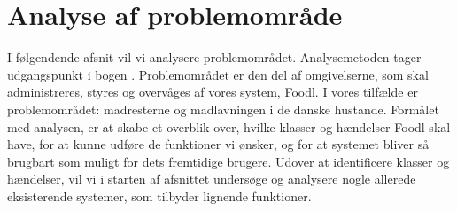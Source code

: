 \chapter{Analyse af problemområde}
\label{chap:analyseafpo}

I følgendende afsnit vil vi analysere problemområdet. Analysemetoden tager udgangspunkt i bogen \cite[s. ~43]{ooad}. Problemområdet er den del af omgivelserne, som skal administreres, styres og overvåges af vores system, Foodl. I vores tilfælde er problemområdet: madresterne og madlavningen i de danske hustande. Formålet med analysen, er at skabe et overblik over, hvilke klasser og hændelser Foodl skal have, for at kunne udføre de funktioner vi ønsker, og for at systemet bliver så brugbart som muligt for dets fremtidige brugere. Udover at identificere klasser og hændelser, vil vi i starten af afsnittet undersøge og analysere nogle allerede eksisterende systemer, som tilbyder lignende funktioner.



 

